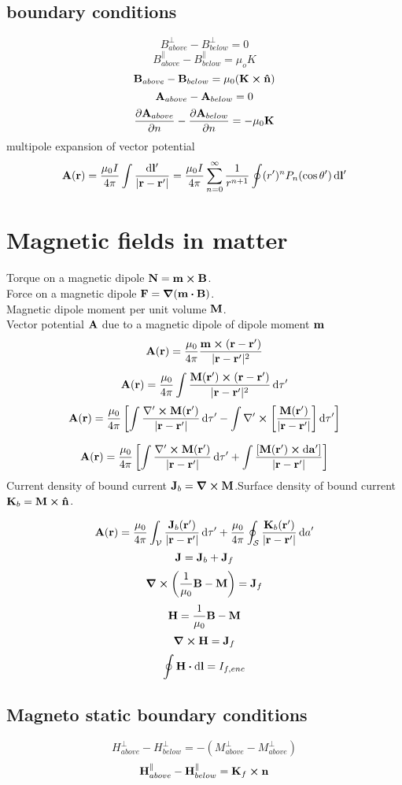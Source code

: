 \documentclass[12pt]{article}
\begin{document}
\subsection*{boundary conditions}
\[B^{\perp}_{above}-B^{\perp}_{below}=0\]
\[B^{\parallel}_{above}-B^{\parallel}_{below}=\mu_oK\]
\[\vb{B}_{above}-\vb{B}_{below}=\mu_0(\vb{K}\cp\vu{n})\]
\[\vb{A}_{above}-\vb{A}_{below}=0\]
\[\pdv{\vb{A}_{above}}{n}-\pdv{\vb{A}_{below}}{n}=-\mu_0\vb{K}\]
multipole expansion of vector potential\[\vb{A(\vb{r})}=\frac{\mu_0I}{4\pi}\int\frac{\dd{\vb{l}'}}{|\vb{r}-\vb{r'}|}=\frac{\mu_0I}{4\pi}\sum_{n=0}^{\infty}\frac{1}{r^{n+1}}\oint(r')^nP_n(\cos\theta')\dd{\vb{l'}}\]
\section{Magnetic fields in matter}
Torque on a magnetic dipole $\vb{N}=\vb{m}\cp\vb{B}$.\\
Force on a magnetic dipole $\vb{F}=\grad(\vb{m}\vdot\vb{B})$.\\
Magnetic dipole moment per unit volume $\vb{M}$.\\
Vector potential $\vb{A}$ due to a magnetic dipole of dipole moment $\vb{m}$ \[\vb{A}(\vb{r})=\frac{\mu_0}{4\pi}\frac{\vb{m}\cp(\vb{r}-\vb{r}')}{|\vb{r}-\vb{r}'|^2}\]
\[\vb{A}(\vb{r})=\frac{\mu_0}{4\pi}\int\frac{\vb{M}(\vb{r'})\cp(\vb{r}-\vb{r}')}{|\vb{r}-\vb{r}'|^2}\dd{\tau'}\]
\[\vb{A}(\vb{r})=\frac{\mu_0}{4\pi}\left[\int\frac{\mathbf{\nabla'}\cp{\vb{M}(\vb{r'})}}{|\vb{r}-\vb{r}'|}\dd{\tau'}-\int\mathbf{\nabla'}\cp\left[{\frac{\vb{M}(\vb{r'})}{|\vb{r}-\vb{r}'|}}\right]\dd{\tau'}\right]\]

\[\vb{A}(\vb{r})=\frac{\mu_0}{4\pi}\left[\int\frac{\mathbf{\nabla'}\cp{\vb{M}(\vb{r'})}}{|\vb{r}-\vb{r}'|}\dd{\tau'}+\int\frac{[{\vb{M}(\vb{r'})}\cp\dd{\vb{a}'}]}{|\vb{r}-\vb{r}'|}\right]\]
Current density of bound current $\vb{J}_b=\curl{\vb{M}}$.Surface density of bound current $\vb{K}_b=\vb{M}\cp\vu{n}$.

\[\vb{A}(\vb{r})=\frac{\mu_0}{4\pi}\int_{\mathcal{V}}\frac{\vb{J}_b(\vb{r}')}{|\vb{r}-\vb{r}'|}\dd{\tau'}+\frac{\mu_0}{4\pi}\oint_{\mathcal{S}}\frac{\vb{K}_b(\vb{r}')}{|\vb{r}-\vb{r}'|}\dd{a}'\]
\[\vb{J}=\vb{J}_b+\vb{J}_f\]
\[\curl{\qty(\frac{1}{\mu_0}\vb{B}-\vb{M})}=\vb{J}_f\]
\[\vb{H}=\frac{1}{\mu_0}\vb{B}-\vb{M}\]
\[\curl{\vb{H}}=\vb{J}_f\]
\[\oint\vb{H}\vdot\dd{\vb{l}}=I_{f,enc}\]
\subsection*{Magneto static boundary conditions}
\[H_{above}^{\perp}-H_{below}^{\perp}=-(M_{above}^{\perp}-M_{above}^{\perp})\]
\[\vb{H}_{above}^{\parallel}-\vb{H}_{below}^{\parallel}=\vb{K}_f\cp\vb{n}\]
\end{document}

